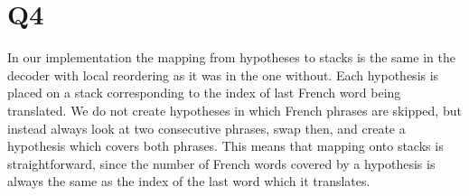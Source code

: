 \section*{Q4}

In our implementation the mapping from hypotheses to stacks is the same in the decoder with local reordering as it was in the one without. Each hypothesis is placed on a stack corresponding to the index of last French word being translated. We do not create hypotheses in which French phrases are skipped, but instead always look at two consecutive phrases, swap then, and create a hypothesis which covers both phrases. This means that mapping onto stacks is straightforward, since the number of French words covered by a hypothesis is always the same as the index of the last word which it translates.

